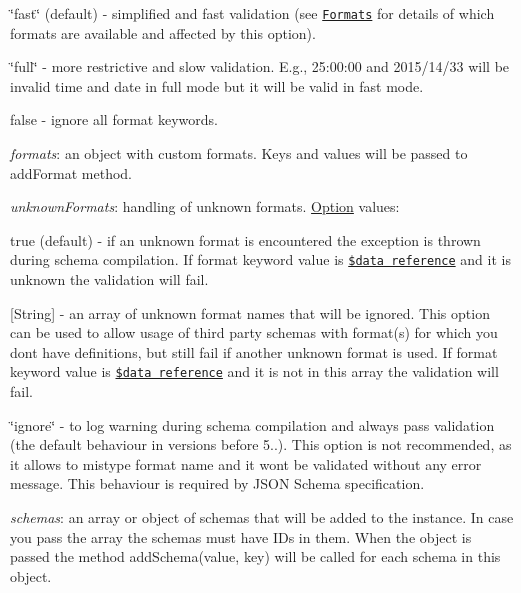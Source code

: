 \begin{DoxyItemize}
\begin{DoxyItemize}
\item {\ttfamily \char`\"{}fast\char`\"{}} (default) -\/ simplified and fast validation (see \href{#formats}{\tt Formats} for details of which formats are available and affected by this option).
\item {\ttfamily \char`\"{}full\char`\"{}} -\/ more restrictive and slow validation. E.\+g., 25\+:00\+:00 and 2015/14/33 will be invalid time and date in \textquotesingle{}full\textquotesingle{} mode but it will be valid in \textquotesingle{}fast\textquotesingle{} mode.
\item {\ttfamily false} -\/ ignore all format keywords.
\end{DoxyItemize}
\item {\itshape formats}\+: an object with custom formats. Keys and values will be passed to {\ttfamily add\+Format} method.
\item {\itshape unknown\+Formats}\+: handling of unknown formats. \mbox{\hyperlink{structOption}{Option}} values\+:
\begin{DoxyItemize}
\item {\ttfamily true} (default) -\/ if an unknown format is encountered the exception is thrown during schema compilation. If {\ttfamily format} keyword value is \href{#data-reference}{\tt \$data reference} and it is unknown the validation will fail.
\item {\ttfamily \mbox{[}String\mbox{]}} -\/ an array of unknown format names that will be ignored. This option can be used to allow usage of third party schemas with format(s) for which you don\textquotesingle{}t have definitions, but still fail if another unknown format is used. If {\ttfamily format} keyword value is \href{#data-reference}{\tt \$data reference} and it is not in this array the validation will fail.
\item {\ttfamily \char`\"{}ignore\char`\"{}} -\/ to log warning during schema compilation and always pass validation (the default behaviour in versions before 5..). This option is not recommended, as it allows to mistype format name and it won\textquotesingle{}t be validated without any error message. This behaviour is required by J\+S\+ON Schema specification.
\end{DoxyItemize}
\item {\itshape schemas}\+: an array or object of schemas that will be added to the instance. In case you pass the array the schemas must have I\+Ds in them. When the object is passed the method {\ttfamily add\+Schema(value, key)} will be called for each schema in this object.

\end{DoxyItemize}
